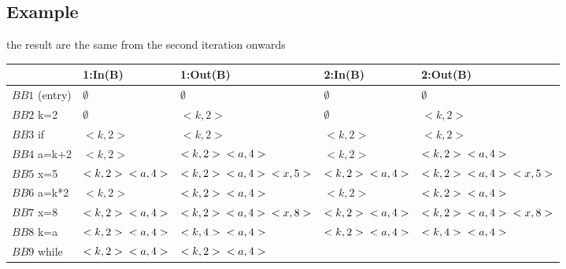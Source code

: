 \documentclass{article}
\begin{document}
	\subsection{Example}
	the result are the same from the second iteration onwards
		\begin{table}[h]
		\centering
		\begin{tabularx}{\textwidth}{|X|X|X|X|X|}
			\hline
			& 1:In(B) & 1:Out(B) & 2:In(B) & 2:Out(B) \\
			\hline
			$BB1$ (entry) & $\emptyset$ & $\emptyset$ & $\emptyset$ & $\emptyset$  \\
			\hline
			$BB2$ k=2 & $\emptyset$ & $<k,2>$ & $\emptyset$ & $<k,2>$ \\
			\hline
			$BB3$ if & $<k,2>$ & $<k,2>$ & $<k,2>$ & $<k,2>$ \\
			\hline
			$BB4$ a=k+2 & $<k,2>$ & $<k,2>\newline<a,4>$ 
						& $<k,2>$ & $<k,2>\newline<a,4>$ \\
			\hline
			$BB5$ x=5 & $<k,2>\newline<a,4>$ & $<k,2>\newline<a,4>\newline<x,5>$ 
					& $<k,2>\newline<a,4>$ & $<k,2>\newline<a,4>\newline<x,5>$ \\
			\hline
			$BB6$ a=k*2 & $<k,2>$ & $<k,2>\newline<a,4>$ 
						& $<k,2>$ & $<k,2>\newline<a,4>$ \\
			\hline
			$BB7$ x=8 & $<k,2>\newline<a,4>$ & $<k,2>\newline<a,4>\newline<x,8>$ 
						& $<k,2>\newline<a,4>$ & $<k,2>\newline<a,4>\newline<x,8>$ \\
			\hline
			$BB8$ k=a & $<k,2>\newline<a,4>$ & $<k,4>\newline<a,4>$ 
						& $<k,2>\newline<a,4>$ & $<k,4>\newline<a,4>$ \\
			\hline
			$BB9$ while & $<k,2>\newline<a,4>$ & $<k,2>\newline<a,4>$ 

\end{tabularx}
\end{table}
\end{document}
